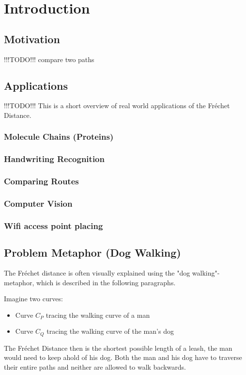 \section{Introduction}

\subsection{Motivation} !!!TODO!!!
	compare two paths

\subsection{Applications} !!!TODO!!!
	This is a short overview of real world applications of the Fréchet Distance.
\subsubsection{Molecule Chains (Proteins)}
\subsubsection{Handwriting Recognition}
\subsubsection{Comparing Routes}
\subsubsection{Computer Vision}
\subsubsection{Wifi access point placing}

\subsection{Problem Metaphor (Dog Walking)} \label{dogwalking}

The Fréchet distance is often visually explained using the "dog walking"-metaphor, which is described in the following paragraphs.

Imagine two curves:
\begin{itemize}
	\item Curve $C_P$ tracing the walking curve of a man
	\item Curve $C_Q$ tracing the walking curve of the man's dog
\end{itemize}

The Fréchet Distance then is the shortest possible length of a leash, the man would need to keep ahold of his dog. Both the man and his dog have to traverse their entire paths and neither are allowed to walk backwards.

